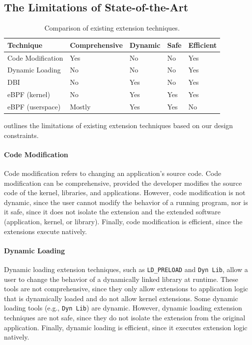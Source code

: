 \subsection{The Limitations of State-of-the-Art} \label{sec:motivation:limitations}

\begin{table}[t]
\centering
\footnotesize
\begin{tabular}{lllll}
\toprule
Technique          & Comprehensive & Dynamic  & Safe  & Efficient \\ \midrule
Code Modification    & Yes           & No       & No    & Yes       \\
Dynamic Loading      & No            & No       & No    & Yes       \\
DBI                  & No            & Yes      & No    & Yes       \\
eBPF (kernel)   & No            & Yes      & Yes   & Yes       \\
eBPF (userspace)     & Mostly        & Yes      & Yes   & No        \\ \bottomrule
\end{tabular}
\caption{Comparison of existing extension techniques.\label{tab:methodology_comparison}}
\end{table}

 outlines the limitations of existing extension techniques based on our design constraints.

\paragraph{Code Modification} Code modification refers to changing an application's source code.  Code modification can be comprehensive, provided the developer modifies the source code of the kernel, libraries, and applications.  However, code modification is not dynamic, since the user cannot modify the behavior of a running program, nor is it safe, since it does not isolate the extension and the extended software (application, kernel, or library).  Finally, code modification is efficient, since the extensions execute natively.

\paragraph{Dynamic Loading}  Dynamic loading extension techniques, such as \texttt{LD\_PRELOAD} and \texttt{Dyn Lib}, allow a user to change the behavior of a dynamically linked library at runtime.  These tools are not comprehensive, since they only allow extensions to application logic that is dynamically loaded and do not allow kernel extensions.  Some dynamic loading tools (e.g., \texttt{Dyn Lib}) are dynamic.  However, dynamic loading extension techniques are not safe, since they do not isolate the extension from the original application.  Finally, dynamic loading is efficient, since it executes extension logic natively.


